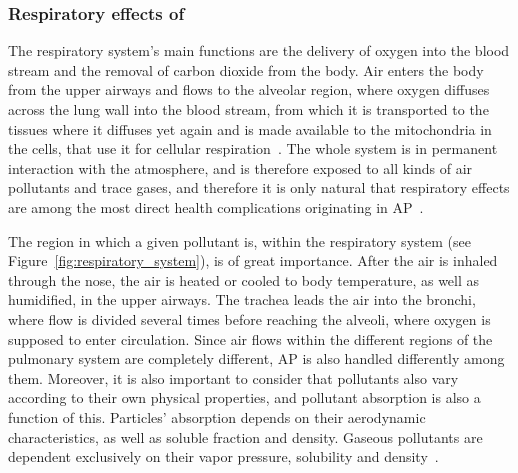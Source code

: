 

\subsubsection{Respiratory effects of }%
\label{ssub:respiratory_system_ailments_related_to_ap}

The respiratory system's main functions are the delivery of oxygen into
the blood stream and the removal of carbon dioxide from the body. Air
enters the body from the upper airways and flows to the alveolar region,
where oxygen diffuses across the lung wall into the blood stream, from
which it is transported to the tissues where it diffuses yet again and
is made available to the mitochondria in the cells, that use it for
cellular respiration~\cite{Nilsson2010}. The whole system is in
permanent interaction with the atmosphere, and is therefore exposed to
all kinds of air pollutants and trace gases, and therefore it is only
natural that respiratory effects are among the most direct health
complications originating in \gls{AP}~\cite{Vallero2014}.

The region in which a given pollutant is, within the respiratory system
(see Figure~\ref{fig:respiratory_system}), is of great importance. After
the air is inhaled through the nose, the air is heated or cooled to body
temperature, as well as humidified, in the upper airways. The trachea
leads the air into the bronchi, where flow is divided several times
before reaching the alveoli, where oxygen is supposed to enter
circulation. Since air flows within the different regions of the
pulmonary system are completely different, \gls{AP} is also handled
differently among them. Moreover, it is also important to consider that
pollutants also vary according to their own physical properties, and
pollutant absorption is also a function of this.  Particles' absorption
depends on their aerodynamic characteristics, as well as soluble
fraction and density. Gaseous pollutants are dependent exclusively on
their vapor pressure, solubility and density~\cite{Nilsson2010,
Vallero2014}.

